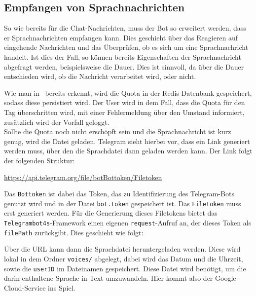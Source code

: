 \subsection{Empfangen von Sprachnachrichten}
So wie bereits für die Chat-Nachrichten, muss der Bot so erweitert werden, dass er Sprachnachrichten empfangen kann. Dies geschieht über das Reagieren auf eingehende Nachrichten und das Überprüfen, ob es sich um eine Sprachnachricht handelt. Ist dies der Fall, so können bereits Eigenschaften der Sprachnachricht abgefragt werden, beispielsweise die Dauer. Dies ist sinnvoll, da über die Dauer entschieden wird, ob die Nachricht verarbeitet wird, oder nicht.



Wie man in~ bereits erkennt, wird die Quota in der Redis-Datenbank gespeichert, sodass diese persistiert wird. Der User wird in dem Fall, dass die Quota für den Tag überschritten wird, mit einer Fehlermeldung über den Umstand informiert, zusätzlich wird der Vorfall geloggt. \\
Sollte die Quota noch nicht erschöpft sein und die Sprachnachricht ist kurz genug, wird die Datei geladen. Telegram sieht hierbei vor, dass ein Link generiert werden muss, über den die Sprachdatei dann geladen werden kann. Der Link folgt der folgenden Struktur:

\url{https://api.telegram.org/file/botBottoken/Filetoken}

Das \texttt{Bottoken} ist dabei das Token, das zu Identifizierung des Telegram-Bots genutzt wird und in der Datei \texttt{bot.token} gespeichert ist. Das \texttt{Filetoken} muss erst generiert werden. Für die Generierung dieses Filetokens bietet das \texttt{Telegrambot4s}-Framework einen eigenen \texttt{request}-Aufruf an, der dieses Token als \texttt{filePath} zurückgibt. Dies geschieht wie folgt:



Über die URL kann dann die Sprachdatei heruntergeladen werden. Diese wird lokal in dem Ordner \texttt{voices/} abgelegt, dabei wird das Datum und die Uhrzeit, sowie die \texttt{userID} im Dateinamen gespeichert.
Diese Datei wird benötigt, um die darin enthaltene Sprache in Text umzuwandeln. Hier kommt also der Google-Cloud-Service ins Spiel.

